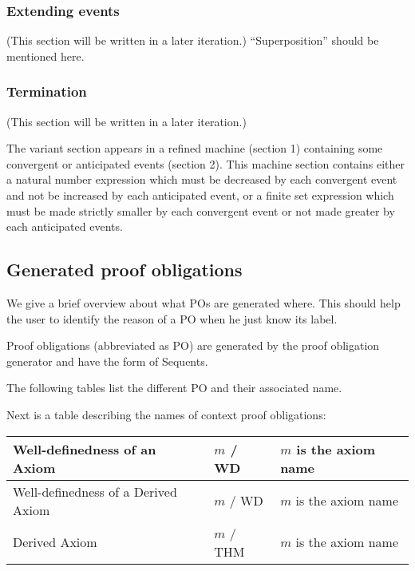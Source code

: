 \subsubsection{Extending events}
\label{extending_events}
(This section will be written in a later iteration.)
``Superposition'' should be mentioned here.


\subsubsection{Termination}
\label{termination}
(This section will be written in a later iteration.)

The variant section appears in a refined machine (section 1) containing some convergent or anticipated events (section 2). This machine section contains either a natural number expression which must be decreased by each convergent event and not be increased by each anticipated event, or a finite set expression which must be made strictly smaller by each convergent event or not made greater by each anticipated events. 

  
\subsection{Generated proof obligations}
\label{ref:generated_proof_obligations}

We give a brief overview about what POs are generated where. This should help the user to identify the reason of a PO when he just know its label.


Proof obligations (abbreviated as PO) are generated by the proof obligation generator and have the form of Sequents. 

The following tables list the different PO and their associated name.

Next is a table describing the names of context proof obligations: 

\begin{center}
    \begin{tabular}{| p{6cm} | p{3cm} | p{5cm} |}
    \hline
	Well-definedness of an Axiom & $m$ / WD & $m$ is the axiom name\\ \hline
	Well-definedness of a Derived Axiom & $m$  / WD & $m$ is the axiom name \\ \hline
	Derived Axiom & $m$  / THM & $m$ is the axiom name \\ \hline
    \end{tabular}
\end{center}

